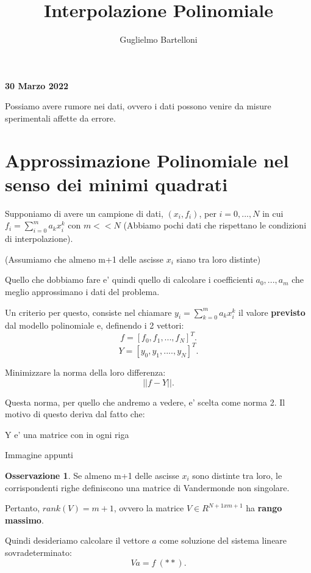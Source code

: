 \documentclass[11pt]{article}
\theoremstyle{definition}
\newtheorem{oss}{Osservazione}
\theoremstyle{plain}
\begin{document}
\title{Interpolazione Polinomiale}
\author{Guglielmo Bartelloni}
\maketitle

\thispagestyle{empty}

\begin{center}
{\LARGE \bf 30 Marzo 2022}\\
\end{center}

Possiamo avere rumore nei dati, ovvero i dati possono venire da misure sperimentali affette da errore.

\section{Approssimazione Polinomiale nel senso dei minimi quadrati}

Supponiamo di avere un campione di dati, $(x_{i},f_{i})$, per $i=0,...,N$ in cui $f_{i}=\sum_{i=0}^{m} a_kx_{i}^{k}$  con $m<<N$ 
(Abbiamo pochi dati che rispettano le condizioni di interpolazione).

(Assumiamo che almeno m+1 delle ascisse $x_{i}$ siano tra loro distinte)

Quello che dobbiamo fare e' quindi quello di calcolare i coefficienti $a_0,...,a_m$ che meglio approssimano i dati del problema.

Un criterio per questo, consiste nel chiamare $y_{i}=\sum_{k=0}^{m} a_kx_{i}^{k}$ il valore \textbf{previsto} dal modello polinomiale e, definendo i 2 vettori:
\[
	f=[f_0,f_1,...,f_N]^{T}
.\] 
\[
	Y=[y_0,y_1,....,y_N]^{T}
.\] 

Minimizzare la norma della loro differenza:
\[
||f-Y||
.\] 

Questa norma, per quello che andremo a vedere, e' scelta come norma 2. Il motivo di questo deriva dal fatto che:

Y e' una matrice con in ogni riga

Immagine appunti

\begin{oss}
	Se almeno m+1 delle ascisse ${x_{i}}$ sono distinte tra loro, le corrispondenti righe definiscono una matrice di Vandermonde non singolare.

	Pertanto, $rank(V)=m+1$, ovvero la matrice $V\in R^{N+1xm+1}$ ha \textbf{rango massimo}. 
\end{oss}

Quindi desideriamo calcolare il vettore $a$  come soluzione del sistema lineare sovradeterminato:
	\[
		Va=f\ (**)
	.\] 
\end{document}
